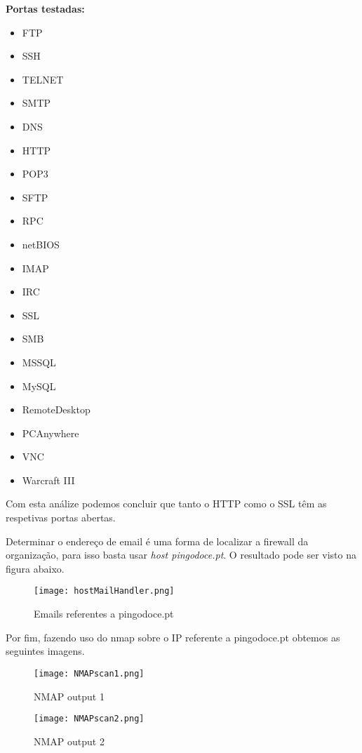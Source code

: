 \par \textbf{Portas testadas:} 
\begin{itemize}
\item FTP
\item SSH
\item TELNET
\item SMTP
\item DNS
\item HTTP
\item POP3
\item SFTP
\item RPC
\item netBIOS
\item IMAP
\item IRC
\item SSL
\item SMB
\item MSSQL
\item MySQL
\item RemoteDesktop
\item PCAnywhere
\item VNC
\item Warcraft III
\end{itemize}

\par Com esta análize podemos concluir que tanto o HTTP como o SSL têm as respetivas portas abertas.\newline


\par Determinar o endereço de email é uma forma de localizar a firewall da organização, para isso basta usar \textit{host pingodoce.pt}. O resultado pode ser visto na figura abaixo.

\begin{figure}[H]

	\centering

 	\texttt{[image: hostMailHandler.png]}
 	\caption {Emails referentes a pingodoce.pt}

  	\label{fig:03}
\end{figure}

\par Por fim, fazendo uso do nmap sobre o IP referente a pingodoce.pt obtemos as seguintes imagens.
 \begin{figure}[H]

	\centering

 	\texttt{[image: NMAPscan1.png]}
 	\caption {NMAP output 1}

  	\label{fig:04}
\end{figure}
\begin{figure}[H]

	\centering

 	\texttt{[image: NMAPscan2.png]}
 	\caption {NMAP output 2}

  	\label{fig:05}
\end{figure}

